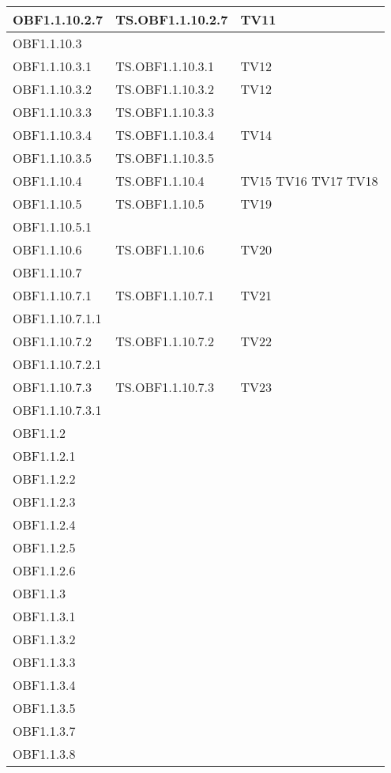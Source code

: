 \documentclass{scalatekids-article}
\begin{document}
\begin{longtable}[H]{|l|p{4cm}|p{4cm}|}
  \hline
  OBF1.1.10.2.7 & TS.OBF1.1.10.2.7 & TV11\\
  \hline
  OBF1.1.10.3 & & \\
  \hline
  OBF1.1.10.3.1 & TS.OBF1.1.10.3.1 & TV12\\
  \hline
  OBF1.1.10.3.2 & TS.OBF1.1.10.3.2 & TV12\\
  \hline
  OBF1.1.10.3.3 & TS.OBF1.1.10.3.3 & \\
  \hline
  OBF1.1.10.3.4 & TS.OBF1.1.10.3.4 & TV14\\
  \hline
  OBF1.1.10.3.5 & TS.OBF1.1.10.3.5 & \\
  \hline
  OBF1.1.10.4 & TS.OBF1.1.10.4 & TV15 TV16 TV17 TV18\\
  \hline
  OBF1.1.10.5 & TS.OBF1.1.10.5 & TV19\\
  \hline
  OBF1.1.10.5.1 & & \\
  \hline
  OBF1.1.10.6 & TS.OBF1.1.10.6 & TV20\\
  \hline
  OBF1.1.10.7 & & \\
  \hline
  OBF1.1.10.7.1 & TS.OBF1.1.10.7.1 & TV21\\
  \hline
  OBF1.1.10.7.1.1 & & \\
  \hline
  OBF1.1.10.7.2 & TS.OBF1.1.10.7.2 & TV22\\
  \hline
  OBF1.1.10.7.2.1 & & \\
  \hline
  OBF1.1.10.7.3 & TS.OBF1.1.10.7.3 & TV23\\
  \hline
  OBF1.1.10.7.3.1 & & \\
  \hline
  OBF1.1.2 & & \\
  \hline
  OBF1.1.2.1 & & \\
  \hline
  OBF1.1.2.2 &  & \\
  \hline
  OBF1.1.2.3 &  & \\
  \hline
  OBF1.1.2.4 &  & \\
  \hline
  OBF1.1.2.5 &  & \\
  \hline
  OBF1.1.2.6 &  & \\
  \hline
  OBF1.1.3 &  & \\
  \hline
  OBF1.1.3.1 &  &\\
  \hline
  OBF1.1.3.2 &  &\\
  \hline
  OBF1.1.3.3 &  &\\
  \hline
  OBF1.1.3.4 &  &\\
  \hline
  OBF1.1.3.5 &  &\\
  \hline
  OBF1.1.3.7 &  &\\
  \hline
  OBF1.1.3.8 &  &\\

\end{longtable}
\end{document}
